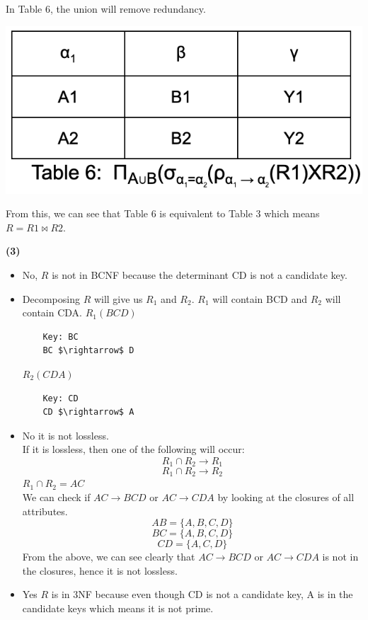 \documentclass[a4paper, 11pt]{article}
\renewcommand{\part}[1] {\vspace{.10in} {\bf (#1)}}
\begin{document}
In Table 6, the union will remove redundancy.
\begin{center}
\includegraphics[scale = 0.7]{pic5.png}\\
\end{center}

From this, we can see that Table 6 is equivalent to Table 3 which means $R = R1 \bowtie R2$.

\part{3} \\

\begin{itemize}
    \item No, $R$ is not in BCNF because the determinant CD is not a candidate key.
    \item Decomposing $R$ will give us $R_1$ and $R_2$. $R_1$ will contain BCD and $R_2$ will contain CDA.
    $R_1(BCD)$ 
    \begin{lstlisting}
    Key: BC
    BC $\rightarrow$ D
    \end{lstlisting}

    $R_2(CDA)$
    \begin{lstlisting}
    Key: CD
    CD $\rightarrow$ A
    \end{lstlisting}

    \item No it is not lossless. \\
    If it is lossless, then one of the following will occur: \\
    $$R_1 \cap R_2 \xrightarrow{} R_1$$ 
    $$R_1 \cap R_2 \xrightarrow{} R_2$$ 
    $R_1 \cap R_2 = AC$ \\
    We can check if $AC \xrightarrow{} BCD$ or $AC \xrightarrow{} CDA$ by looking at the closures of all attributes.
    $$AB=\{A, B, C, D\}$$
    $$BC=\{A, B, C, D\}$$
    $$CD=\{A, C, D\}$$
    From the above, we can see clearly that $AC \xrightarrow{} BCD$ or $AC \xrightarrow{} CDA$ is not in the closures, hence it is not lossless.
    
    \item Yes $R$ is in 3NF because even though CD is not a candidate key, A is in the candidate keys which means it is not prime.
\end{itemize}
\end{document}
